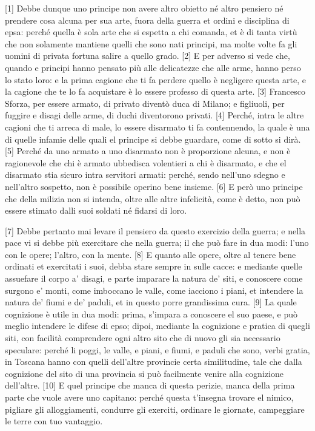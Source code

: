 
{[}1{]} Debbe dunque uno principe non avere altro obietto né altro
pensiero né prendere cosa alcuna per sua arte, fuora della guerra et
ordini e disciplina di epsa: perché quella è sola arte che si espetta a
chi comanda, et è di tanta virtù che non solamente mantiene quelli che
sono nati principi, ma molte volte fa gli uomini di privata fortuna
salire a quello grado. {[}2{]} E per adverso si vede che, quando e
principi hanno pensato più alle delicatezze che alle arme, hanno perso
lo stato loro: e la prima cagione che ti fa perdere quello è negligere
questa arte, e la cagione che te lo fa acquistare è lo essere professo
di questa arte. {[}3{]} Francesco Sforza, per essere armato, di privato
diventò duca di Milano; e figliuoli, per fuggire e disagi delle arme, di
duchi diventorono privati. {[}4{]} Perché, intra le altre cagioni che ti
arreca di male, lo essere disarmato ti fa contennendo, la quale è una di
quelle infamie delle quali el principe si debbe guardare, come di sotto
si dirà. {[}5{]} Perché da uno armato a uno disarmato non è proporzione
alcuna, e non è ragionevole che chi è armato ubbedisca volentieri a chi
è disarmato, e che el disarmato stia sicuro intra servitori armati:
perché, sendo nell'uno sdegno e nell'altro sospetto, non è possibile
operino bene insieme. {[}6{]} E però uno principe che della milizia non
si intenda, oltre alle altre infelicità, come è detto, non può essere
stimato dalli suoi soldati né fidarsi di loro.

\pagebreak

{[}7{]} Debbe pertanto mai levare il pensiero da questo exercizio della
guerra; e nella pace vi si debbe più exercitare che nella guerra; il che
può fare in dua modi: l'uno con le opere; l'altro, con la mente. {[}8{]}
E quanto alle opere, oltre al tenere bene ordinati et exercitati i suoi,
debba stare sempre in sulle cacce: e mediante quelle assuefare il corpo
a' disagi, e parte imparare la natura de' siti, e conoscere come surgono
e' monti, come imboccano le valle, come iacciono i piani, et intendere
la natura de' fiumi e de' paduli, et in questo porre grandissima cura.
{[}9{]} La quale cognizione è utile in dua modi: prima, s'impara a
conoscere el suo paese, e può meglio intendere le difese di epso; dipoi,
mediante la cognizione e pratica di quegli siti, con facilità
comprendere ogni altro sito che di nuovo gli sia necessario speculare:
perché li poggi, le valle, e piani, e fiumi, e paduli che sono, verbi
gratia, in Toscana hanno con quelli dell'altre provincie certa
similitudine, tale che dalla cognizione del sito di una provincia si può
facilmente venire alla cognizione dell'altre. {[}10{]} E quel principe
che manca di questa perizie, manca della prima parte che vuole avere uno
capitano: perché questa t'insegna trovare el nimico, pigliare gli
alloggiamenti, condurre gli exerciti, ordinare le giornate, campeggiare
le terre con tuo vantaggio.

